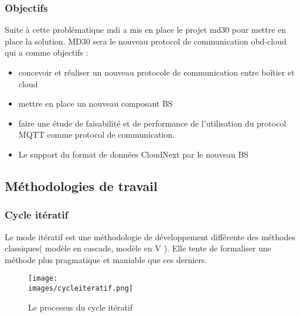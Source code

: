          \subsubsection{Objectifs}
           Suite à cette problématique \gls{mdi} a mis en place le projet \gls{md30} pour mettre en place la solution.
           MD30 sera le nouveau protocol de communication \gls{obd}-cloud qui a comme objectifs :
            \begin{itemize}
                \renewcommand{\labelitemi}{$\bullet$}
                \item concevoir et réaliser un nouveau protocole de communication entre boîtier et cloud
                \item mettre en place un nouveau composant \gls{BS}
                \item faire une étude de faisabilité et de performance de l'utilisation du protocol MQTT 
                comme protocol de communication.
                \item Le support du format de données CloudNext par le nouveau BS
            \end{itemize} 

    \subsection{Méthodologies de travail}
        \subsubsection{Cycle itératif }
            Le mode itératif est une méthodologie de développement différente des méthodes classiques( modèle en cascade, modèle en V ).
            Elle tente de formaliser une méthode plus pragmatique et maniable que ces derniers. 
            \begin{figure}[ht]
                \centering
                \texttt{[image: \\images/cycleiteratif.png]}
                \caption{Le processus du cycle itératif}
            \end{figure}
           
            \vspace{0.2cm}

